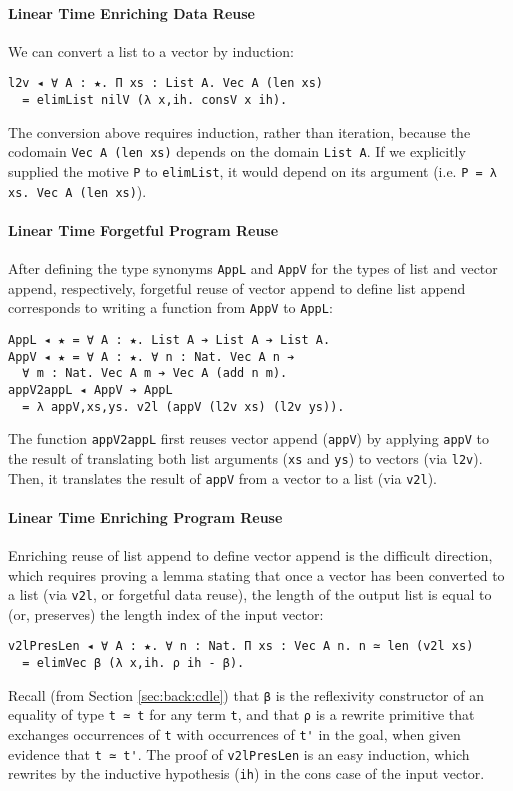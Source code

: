 \documentclass[acmsmall]{acmart}\settopmatter{}
\newcommand{\refsec}[1]{Section \ref{sec:#1}}
\begin{document}
\paragraph{Linear Time Enriching Data Reuse}
We can convert a list to a vector by induction:
\begin{verbatim}
l2v ◂ ∀ A : ★. Π xs : List A. Vec A (len xs)
  = elimList nilV (λ x,ih. consV x ih).
\end{verbatim}
The conversion above requires induction, rather than iteration,
because the codomain \texttt{Vec A (len xs)} depends on the domain
\verb;List A;. If we explicitly supplied the motive \verb;P; to
\verb;elimList;, it would depend on its argument
(i.e. \verb;P = λ xs. Vec A (len xs);).

\paragraph{Linear Time Forgetful Program Reuse}
After defining the type synonyms \verb;AppL; and \verb;AppV; for the
types of list and vector append, respectively, forgetful reuse of
vector append to define list append corresponds to writing a function from
\verb;AppV; to \verb;AppL;:
\begin{verbatim}
AppL ◂ ★ = ∀ A : ★. List A ➔ List A ➔ List A.
AppV ◂ ★ = ∀ A : ★. ∀ n : Nat. Vec A n ➔ 
  ∀ m : Nat. Vec A m ➔ Vec A (add n m).
appV2appL ◂ AppV ➔ AppL
  = λ appV,xs,ys. v2l (appV (l2v xs) (l2v ys)).
\end{verbatim}
The function \verb;appV2appL; first reuses vector append
(\verb;appV;) by applying \verb;appV; to the result of
translating both list arguments (\verb;xs; and \verb;ys;) to
vectors (via \verb;l2v;). Then, it translates the result of
\verb;appV; from a vector to a list (via \verb;v2l;).

\paragraph{Linear Time Enriching Program Reuse}

Enriching reuse of list append to define vector append is the
difficult direction, which requires proving a lemma stating
that once a vector has been converted to a list
(via \verb;v2l;, or forgetful data reuse), the length of the output
list is equal to (or, preserves) the length index of the input vector:
\begin{verbatim}
v2lPresLen ◂ ∀ A : ★. ∀ n : Nat. Π xs : Vec A n. n ≃ len (v2l xs) 
  = elimVec β (λ x,ih. ρ ih - β).
\end{verbatim}
Recall (from \refsec{back:cdle}) that \verb;β; is the reflexivity constructor
of an equality of type \verb;t ≃ t; for any term \verb;t;,
and that \verb;ρ; is a rewrite primitive that exchanges
occurrences of \verb;t; with occurrences of \verb;t'; in the goal,
when given evidence that \verb;t ≃ t';. The proof of \verb;v2lPresLen;
is an easy induction, which rewrites by the inductive hypothesis
(\verb;ih;) in the cons case of the input vector.
\end{document}
